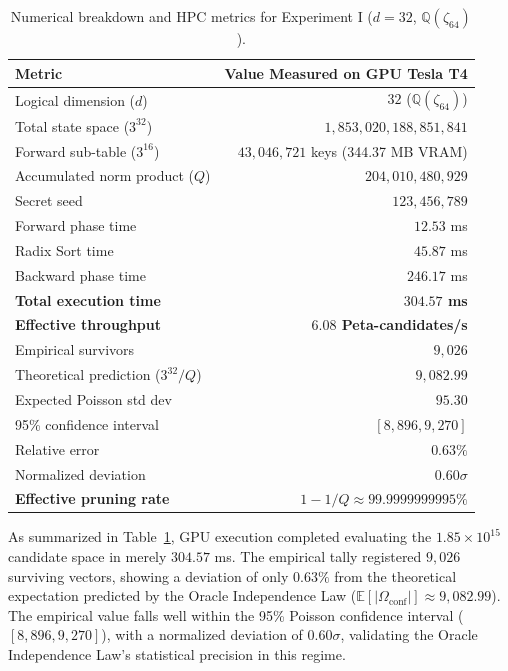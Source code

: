 \documentclass[11pt,a4paper]{article}
\theoremstyle{plain}
\theoremstyle{definition}
\numberwithin{equation}{section}
\newcommand{\QQ}{\mathbb{Q}}
\newcommand{\E}{\mathbb{E}}
\begin{document}
\begin{table}[htbp]
\centering
\caption{Numerical breakdown and HPC metrics for Experiment I ($d=32$, $\QQ(\zeta_{64})$).}
\label{tab:exp1_d32}
\begin{tabular}{l r}
\toprule
\textbf{Metric} & \textbf{Value Measured on GPU Tesla T4} \\
\midrule
Logical dimension ($d$) & $32$ ($\QQ(\zeta_{64})$) \\
Total state space ($3^{32}$) & $1{,}853{,}020{,}188{,}851{,}841$ \\
Forward sub-table ($3^{16}$) & $43{,}046{,}721$ keys (344.37 MB VRAM) \\
Accumulated norm product ($Q$) & $204{,}010{,}480{,}929$ \\
Secret seed & $123{,}456{,}789$ \\
\midrule
Forward phase time & $12.53$ ms \\
Radix Sort time & $45.87$ ms \\
Backward phase time & $246.17$ ms \\
\textbf{Total execution time} & \textbf{$304.57$ ms} \\
\textbf{Effective throughput} & \textbf{$6.08$ Peta-candidates/s} \\
\midrule
Empirical survivors & $9{,}026$ \\
Theoretical prediction ($3^{32}/Q$) & $9{,}082.99$ \\
Expected Poisson std dev & $95.30$ \\
95\% confidence interval & $[8{,}896, 9{,}270]$ \\
Relative error & $0.63\%$ \\
Normalized deviation & $0.60\sigma$ \\
\textbf{Effective pruning rate} & \textbf{$1 - 1/Q \approx 99.9999999995\%$} \\
\bottomrule
\end{tabular}
\end{table}

As summarized in Table~\ref{tab:exp1_d32}, GPU execution completed evaluating the $1.85 \times 10^{15}$ candidate space in merely $304.57$ ms. The empirical tally registered $9{,}026$ surviving vectors, showing a deviation of only $0.63\%$ from the theoretical expectation predicted by the Oracle Independence Law ($\E[|\Omega_{\text{conf}}|] \approx 9{,}082.99$). The empirical value falls well within the 95\% Poisson confidence interval ($[8{,}896, 9{,}270]$), with a normalized deviation of $0.60\sigma$, validating the Oracle Independence Law's statistical precision in this regime.
\end{document}
